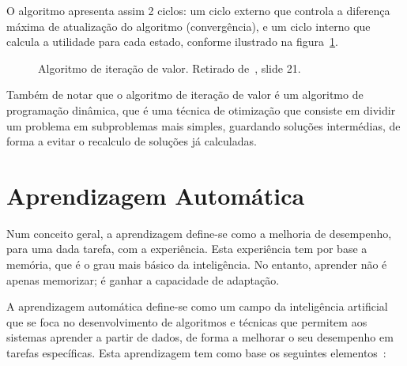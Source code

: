 O algoritmo apresenta assim 2 ciclos: um ciclo externo que controla a diferença máxima de atualização do algoritmo (convergência), e um ciclo interno que calcula a utilidade para cada estado, conforme ilustrado na figura~\ref{fig:algoritmo-iteracao-valor}.

\begin{figure}[H]
    \begin{center}
    \end{center}
    \caption{Algoritmo de iteração de valor.
    Retirado de~\cite{isel:iasa:slides:processos-decisao-sequencial}, slide 21.}
    \label{fig:algoritmo-iteracao-valor}
\end{figure}

Também de notar que o algoritmo de iteração de valor é um algoritmo de programação dinâmica, que é uma técnica de otimização que consiste em dividir um problema em subproblemas mais simples, guardando soluções intermédias, de forma a evitar o recalculo de soluções já calculadas.


\section{Aprendizagem Automática}\label{sec:aprendizagem-automatica}

Num conceito geral, a aprendizagem define-se como a melhoria de desempenho, para uma dada tarefa, com a experiência.
Esta experiência tem por base a memória, que é o grau mais básico da inteligência. No entanto, aprender não é apenas memorizar; é ganhar a capacidade de adaptação.

A aprendizagem automática define-se como um campo da inteligência artificial que se foca no desenvolvimento de algoritmos e técnicas que permitem aos sistemas aprender a partir de dados, de forma a melhorar o seu desempenho em tarefas específicas.
Esta aprendizagem tem como base os seguintes elementos~\cite{isel:iasa:slides:aprendizagem-por-reforco}:

